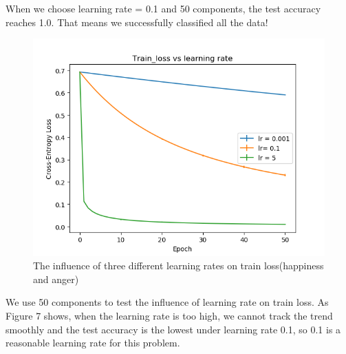 \documentclass{article} %
\begin{document}
When we choose learning rate = 0.1 and 50 components, the test accuracy reaches 1.0. That means we successfully classified all the data!\\
\begin{figure}[h]
	\centering
	\includegraphics[scale=0.5]{./graph/diff_lr.png}
	\caption{The influence of three different learning rates on train loss(happiness and anger)}
\end{figure}
We use 50 components to test the influence of learning rate on train loss. As Figure 7 shows, when the learning rate is too high, we cannot track the trend smoothly and the test accuracy is the lowest under learning rate 0.1, so 0.1 is a reasonable learning rate for this problem.
\end{document}
